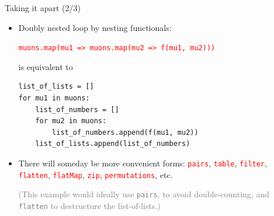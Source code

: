 \documentclass{beamer}
\begin{document}
\begin{frame}[fragile]{Taking it apart (2/3)}
\begin{itemize}
\item Doubly nested loop by nesting functionals:

{\tt\small \textcolor{red}{muons.map(mu1 => muons.map(mu2 => f(mu1, mu2)))}}

is equivalent to

\small
\begin{verbatim}
list_of_lists = []
for mu1 in muons:
    list_of_numbers = []
    for mu2 in muons:
        list_of_numbers.append(f(mu1, mu2))
    list_of_lists.append(list_of_numbers)
\end{verbatim}

\item There will someday be more convenient forms: \textcolor{red}{\tt pairs}, \textcolor{red}{\tt table}, \textcolor{red}{\tt filter}, \textcolor{red}{\tt flatten}, \textcolor{red}{\tt flatMap}, \textcolor{red}{\tt zip}, \textcolor{red}{\tt permutations}, etc.

\vspace{0.2 cm}
\textcolor{gray}{(This example would ideally use \textcolor{lightred}{\tt pairs}, to avoid double-counting, and \textcolor{lightred}{\tt flatten} to destructure the list-of-lists.)}
\end{itemize}
\end{frame}
\end{document}
